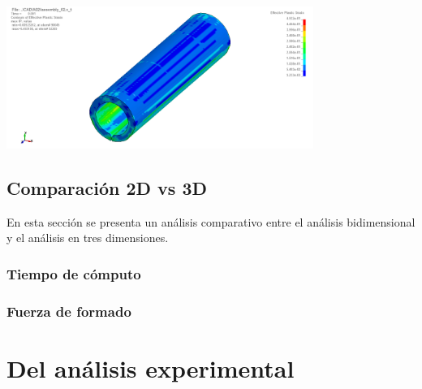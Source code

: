 \begin{center}
\includegraphics[width=0.75\textwidth]{src/ch4/eqv_strain_01.png}
\label{fig:eqv_strain_01}
\end{center}


\subsection{Comparación 2D vs 3D}

En esta sección se presenta un análisis comparativo entre el análisis bidimensional 
y el análisis en tres dimensiones.

\subsubsection{Tiempo de cómputo}

\subsubsection{Fuerza de formado}


\section{Del análisis experimental}



